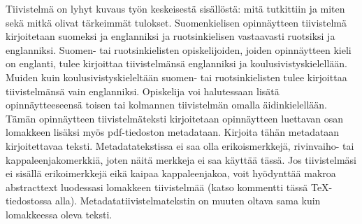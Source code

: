 \documentclass[english, 12pt, a4paper, sci, utf8, a-2b, online]{aaltothesis}
\begin{document}
\newpage
\date{9.2.2023}
\begin{abstractpage}[finnish]
Tiivistelmä on lyhyt kuvaus työn keskeisestä sisällöstä: mitä tutkittiin ja 
miten sekä mitkä olivat tärkeimmät tulokset. Suomenkielisen opinnäytteen 
tiivistelmä kirjoitetaan suomeksi ja englanniksi ja ruotsinkielisen vastaavasti 
ruotsiksi ja englanniksi. Suomen- tai ruotsinkielisten opiskelijoiden, joiden 
opinnäytteen kieli on englanti, tulee kirjoittaa tiivistelmänsä englanniksi ja 
koulusivistyskielellään. Muiden kuin koulusivistyskieleltään suomen- tai 
ruotsinkielisten tulee kirjoittaa tiivistelmänsä vain englanniksi. Opiskelija 
voi halutessaan lisätä opinnäytteeseensä toisen tai kolmannen tiivistelmän 
omalla äidinkielellään.
Tämän opinnäytteen tiivistelmäteksti kirjoitetaan opinnäytteen luettavan osan
lomakkeen lisäksi myös pdf-tiedoston metadataan. Kirjoita tähän metadataan
kirjoitettavaa teksti. Metadatatekstissa ei saa olla erikoismerkkejä,
rivinvaiho- tai kappaleenjakomerkkiä, joten näitä merkkeja ei saa käyttää tässä.
Jos tiivistelmäsi ei sisällä erikoimerkkejä eikä kaipaa kappaleenjakoa, voit
hyödynttää makroa abstracttext luodessasi lomakkeen tiivistelmää (katso
kommentti tässä TeX-tiedostossa alla). Metadatatiivistelmatekstin on muuten 
oltava sama kuin lomakkeessa oleva teksti.

\end{abstractpage}

\newpage
\end{document}
